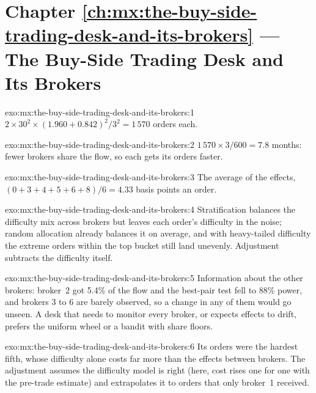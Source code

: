 \section*{Chapter \ref{ch:mx:the-buy-side-trading-desk-and-its-brokers} --- The Buy-Side Trading Desk and Its Brokers}

\begin{solution}{exo:mx:the-buy-side-trading-desk-and-its-brokers:1}
$2\times30^2\times(1.960+0.842)^2/3^2=1\,570$ orders each.
\end{solution}

\begin{solution}{exo:mx:the-buy-side-trading-desk-and-its-brokers:2}
$1\,570\times3/600=7.8$ months: fewer brokers share the flow, so each gets its orders faster.
\end{solution}

\begin{solution}{exo:mx:the-buy-side-trading-desk-and-its-brokers:3}
The average of the effects, $(0+3+4+5+6+8)/6=4.33$ basis points an order.
\end{solution}

\begin{solution}{exo:mx:the-buy-side-trading-desk-and-its-brokers:4}
Stratification balances the difficulty mix across brokers but leaves each order's difficulty in the noise; random allocation already balances it on
average, and with heavy-tailed difficulty the extreme orders within the top bucket still land unevenly. Adjustment subtracts the difficulty itself.
\end{solution}

\begin{solution}{exo:mx:the-buy-side-trading-desk-and-its-brokers:5}
Information about the other brokers: broker~2 got 5.4\% of the flow and the best-pair test fell to 88\% power, and brokers 3 to 6 are barely
observed, so a change in any of them would go unseen. A desk that needs to monitor every broker, or expects effects to drift, prefers the uniform wheel
or a bandit with share floors.
\end{solution}

\begin{solution}{exo:mx:the-buy-side-trading-desk-and-its-brokers:6}
Its orders were the hardest fifth, whose difficulty alone costs far more than the effects between brokers. The adjustment assumes the difficulty
model is right (here, cost rises one for one with the pre-trade estimate) and extrapolates it to orders that only broker~1 received.
\end{solution}

